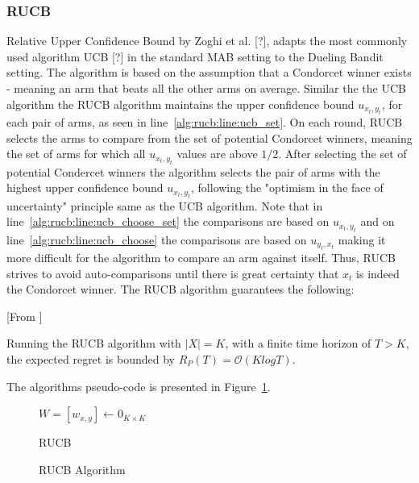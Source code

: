 \documentclass{llncs}
\begin{document}
	\subsubsection{RUCB} Relative Upper Confidence Bound by Zoghi et al. [?], adapts the most commonly used algorithm UCB [?] in the standard MAB setting to the Dueling Bandit setting.
	The algorithm is based on the assumption that a Condorcet winner exists - meaning an arm that beats all the other arms on average. 
	Similar the the UCB algorithm the RUCB algorithm maintains the upper confidence bound $u_{x_t,y_t}$, for each pair of arms, as seen in line~\ref{alg:rucb:line:ucb_set}.
	On each round, RUCB selects the arms to compare from the set of potential Condorcet winners, meaning the set of arms for which all $u_{x_t,y_t}$ values are above $1/2$.
	After selecting the set of potential Condercet winners the algorithm selects the pair of arms with the highest upper confidence bound $u_{x_t,y_t}$, following the "optimism in the face of uncertainty" principle same as the UCB algorithm.
	Note that in line~\ref{alg:rucb:line:ucb_choose_set} the comparisons are based on $u_{x_t,y_t}$ and on line~\ref{alg:rucb:line:ucb_choose} the comparisons are based on $u_{y_t,x_t}$ making it more difficult for the algorithm to compare an arm against itself.
	Thus, RUCB strives to avoid auto-comparisons until there is great certainty that $x_t$ is indeed the Condorcet winner.
	The RUCB algorithm guarantees the following:
	\begin{theorem}\label{thm:BTM}[From \cite{...}]

		Running the RUCB algorithm with $|X|=K$, with a finite time horizon of $T>K$, the expected regret is bounded by $R_P(T) = \mathcal{O} \left( K log T \right)$.

	\end{theorem}
	The algorithms pseudo-code is presented in Figure~\ref{algo_RUCB}.
	\begin{figure}[h]
	\IncMargin{1em}
		\begin{algorithm}[H]
		
		$ W = [w_{x,y}]\leftarrow 0_{K \times K} $\\
		\BlankLine
			\caption{RUCB}
		\end{algorithm}
		\caption{RUCB Algorithm}\label{algo_RUCB}
	\end{figure}
	
\end{document}
